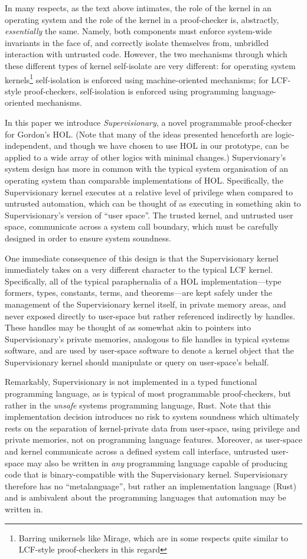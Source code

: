 \documentclass[a4paper, UKenglish, cleveref, autoref, thm-restate]{lipics-v2021}
\begin{document}
In many respects, as the text above intimates, the role of the kernel in an operating system and the role of the kernel in a proof-checker is, abstractly, \emph{essentially} the same.
Namely, both components must enforce system-wide invariants in the face of, and correctly isolate themselves from, unbridled interaction with untrusted code.
However, the two mechanisms through which these different types of kernel self-isolate are very different: for operating system kernels\footnote{Barring unikernels like Mirage, which are in some respects quite similar to LCF-style proof-checkers in this regard} self-isolation is enforced using machine-oriented mechanisms; for LCF-style proof-checkers, self-isolation is enforced using programming language-oriented mechanisms.

In this paper we introduce \emph{Supervisionary}, a novel programmable proof-checker for Gordon's HOL.
(Note that many of the ideas presented henceforth are logic-independent, and though we have chosen to use HOL in our prototype, can be applied to a wide array of other logics with minimal changes.)
Supervionary's system design has more in common with the typical system organisation of an operating system than comparable implementations of HOL.
Specifically, the Supervisionary kernel executes at a relative level of privilege when compared to untrusted automation, which can be thought of as executing in something akin to Supervisionary's version of ``user space''.
The trusted kernel, and untrusted user space, communicate across a system call boundary, which must be carefully designed in order to ensure system soundness.

One immediate consequence of this design is that the Supervisionary kernel immediately takes on a very different character to the typical LCF kernel.
Specifically, all of the typical paraphernalia of a HOL implementation---type formers, types, constants, terms, and theorems---are kept safely under the management of the Supervisionary kernel itself, in private memory areas, and never exposed directly to user-space but rather referenced indirectly by handles.
These handles may be thought of as somewhat akin to pointers into Supervisionary's private memories, analogous to file handles in typical systems software, and are used by user-space software to denote a kernel object that the Supervisionary kernel should manipulate or query on user-space's behalf.

Remarkably, Supervisionary is not implemented in a typed functional programming language, as is typical of most programmable proof-checkers, but rather in the \emph{unsafe} systems programming language, Rust.
Note that this implementation decision introduces no risk to system soundness which ultimately rests on the separation of kernel-private data from user-space, using privilege and private memories, not on programming language features.
Moreover, as user-space and kernel communicate across a defined system call interface, untrusted user-space may also be written in \emph{any} programming language capable of producing code that is binary-compatible with the Supervisionary kernel.
Supervisionary therefore has no ``metalanguage'', but rather an implementation language (Rust) and is ambivalent about the programming languages that automation may be written in.
\end{document}

